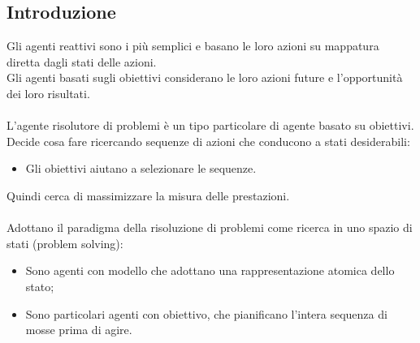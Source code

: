 \documentclass[../main.tex]{subfiles}
\begin{document}
	\subsection{Introduzione}
	Gli agenti reattivi sono i più semplici e basano le loro azioni su mappatura diretta dagli stati delle azioni.\\
	Gli agenti basati sugli obiettivi considerano le loro azioni future e l'opportunità dei loro risultati.\\ \\
	L'agente risolutore di problemi è un tipo particolare di agente basato su obiettivi. Decide cosa fare ricercando sequenze di azioni che conducono a stati desiderabili:
	\begin{itemize}
		\item 	Gli obiettivi aiutano a selezionare le sequenze.
	\end{itemize} 
	Quindi cerca di massimizzare la misura delle prestazioni.\\ \\
	Adottano il paradigma della risoluzione di problemi come ricerca in uno spazio di stati (problem solving):
	\begin{itemize}
		\item 	Sono agenti con modello che adottano una rappresentazione atomica dello stato;
		\item Sono particolari agenti con obiettivo, che pianificano l’intera sequenza di mosse prima di agire.
	\end{itemize}
\end{document}
